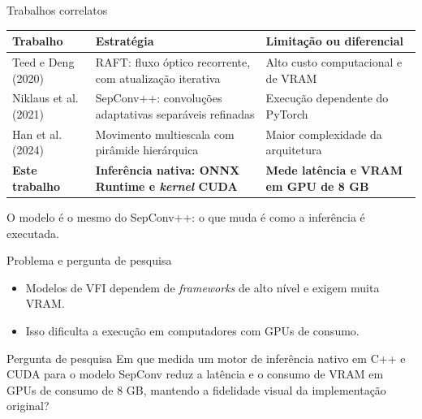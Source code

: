 \documentclass[
    aspectratio=169,
    12pt,
    brazil,
    xcolor=table
]{beamer}
\begin{document}
\begin{frame}{Trabalhos correlatos}
  \centering
  \footnotesize
  \renewcommand{\arraystretch}{1.25}
  \begin{tabular}{p{2.9cm}p{5.1cm}p{5.1cm}}
    \toprule
    \textbf{Trabalho} & \textbf{Estratégia} & \textbf{Limitação ou diferencial} \\
    \midrule
    Teed e Deng (2020) & RAFT: fluxo óptico recorrente, com atualização iterativa & Alto custo computacional e de VRAM \\
    Niklaus et al. (2021) & SepConv++: convoluções adaptativas separáveis refinadas & Execução dependente do PyTorch \\
    Han et al. (2024) & Movimento multiescala com pirâmide hierárquica & Maior complexidade da arquitetura \\
    \rowcolor{senacblue!15}
    \textbf{Este trabalho} & \textbf{Inferência nativa: ONNX Runtime e \textit{kernel} CUDA} & \textbf{Mede latência e VRAM em GPU de 8 GB} \\
    \bottomrule
  \end{tabular}
  \vspace{8pt}

  \small O modelo é o mesmo do SepConv++: o que muda é como a inferência é executada.
\end{frame}

\begin{frame}{Problema e pergunta de pesquisa}
  \begin{itemize}
    \item Modelos de VFI dependem de \textit{frameworks} de alto nível e exigem muita VRAM.
    \item Isso dificulta a execução em computadores com GPUs de consumo.
  \end{itemize}
  \vspace{6pt}
  \begin{block}{Pergunta de pesquisa}
    Em que medida um motor de inferência nativo em C++ e CUDA para o modelo SepConv reduz a latência e o consumo de VRAM em GPUs de consumo de 8 GB, mantendo a fidelidade visual da implementação original?
  \end{block}
\end{frame}

\end{document}
